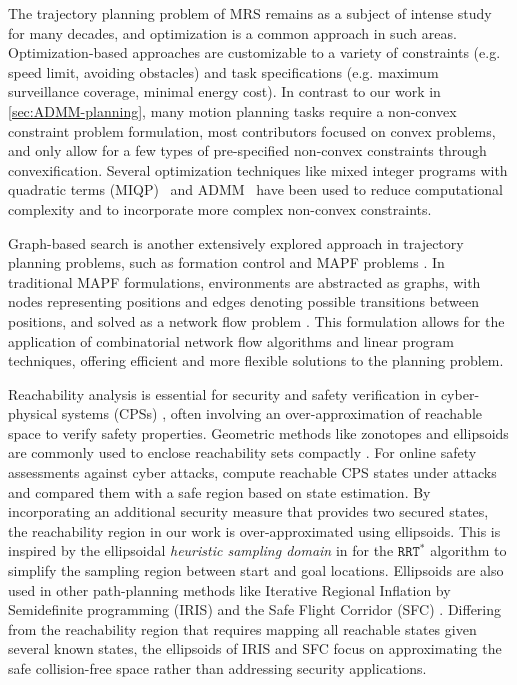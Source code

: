 \documentclass[10pt,twocolumn,twoside]{IEEEtran}
\begin{document}
\noindent{} The trajectory planning problem of MRS remains as a subject of intense study for many decades, and optimization is a common approach in such areas. Optimization-based approaches are customizable to a variety of constraints (e.g. speed limit, avoiding obstacles) and task specifications (e.g. maximum surveillance coverage, minimal energy cost). In contrast to our work in \cref{sec:ADMM-planning}, many motion planning tasks require a non-convex constraint problem formulation, most contributors focused on convex problems, and only allow for a few types of pre-specified non-convex constraints through convexification\cite{liu2014solving}\cite{VanParys2016}\cite{Schulman2014}. Several optimization techniques like mixed integer programs with quadratic terms (MIQP)~\cite{mellinger2012mixed} and ADMM~\cite{bento2013message} have been used to reduce computational complexity and to incorporate more complex non-convex constraints.

Graph-based search is another extensively explored approach in trajectory planning problems, such as formation control \cite{tanner2004leader,hu2019distributed} and MAPF problems \cite{stern2019multi}. In traditional MAPF formulations, environments are abstracted as graphs, with nodes representing positions and edges denoting possible transitions between positions, and solved as a network flow problem \cite{yu2013multi,yu2016optimal}. This formulation allows for the application of combinatorial network flow algorithms and linear program techniques, offering efficient and more flexible solutions to the planning problem.

Reachability analysis is essential for security and safety verification in cyber-physical systems (CPSs) \cite{gueguen2009safety, ding2020secure}, often involving an over-approximation of reachable space to verify safety properties. Geometric methods like zonotopes and ellipsoids are commonly used to enclose reachability sets compactly \cite{kurzhanski2000ellipsoidal, lakhal2019interval, maiga2015comprehensive}. For online safety assessments against cyber attacks, \cite{kwon2017reachability} compute reachable CPS states under attacks and compared them with a safe region based on state estimation. By incorporating an additional security measure that provides two secured states, the reachability region in our work is over-approximated using ellipsoids. This is inspired by the ellipsoidal \emph{heuristic sampling domain} in \cite{gammell2014informed} for the $\mathtt{RRT^*}$ algorithm to simplify the sampling region between start and goal locations. Ellipsoids are also used in other path-planning methods like Iterative Regional Inflation by Semidefinite programming (IRIS) \cite{deits2015computing, ray2022free} and the Safe Flight Corridor (SFC) \cite{liu2017planning, fan2024flying}. Differing from the reachability region that requires mapping all reachable states given several known states, the ellipsoids of IRIS and SFC focus on approximating the safe collision-free space rather than addressing security applications.
\end{document}
